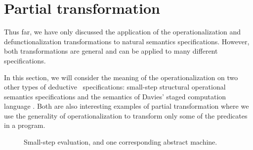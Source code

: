 \section{Partial transformation}
\label{sec:othertransform}

Thus far, we have only discussed the application of the
operationalization and defunctionalization transformations to natural
semantics specifications. However, both transformations are general
and can be applied to many different specifications. 

In this section, we will consider the meaning of the
operationalization on two other types of deductive
\sls~specifications: small-step structural operational semantics
specifications and the semantics of Davies' staged computation
language \rowan. Both are also interesting examples of partial
transformation where we use the generality of operationalization
to transform only some of the predicates in a program.






\begin{figure}[tp]
\begin{minipage}[b]{0.450\linewidth}
\end{minipage}
\hspace{0.5cm}
\begin{minipage}[b]{0.50\linewidth}
\end{minipage}
\caption{Small-step evaluation, and one corresponding abstract machine.}
\label{fig:cbv-sos}
\end{figure}

